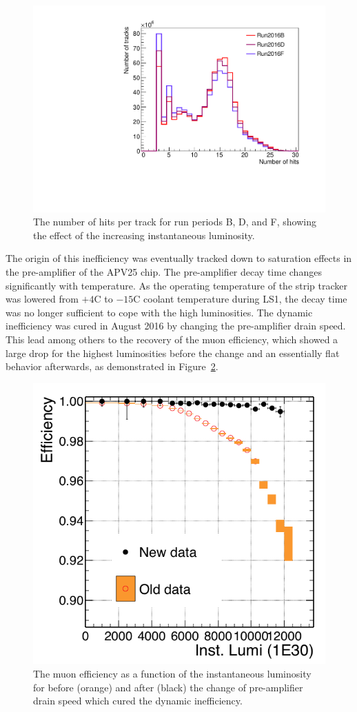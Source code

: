 \begin{figure}[ht]
  \centering
 \includegraphics[width=.6\textwidth]{nhits_perRunPeriod}
 \caption{The number of hits per track for run periods B, D, and F, showing the effect of the increasing instantaneous luminosity.}
 \label{fig:nhits}
\end{figure}

The origin of this inefficiency was eventually tracked down to saturation effects in the pre-amplifier of the APV25 chip. The pre-amplifier decay time changes significantly with temperature. As the operating temperature of the strip tracker was lowered from $+4$\degree C to $-15$\degree C coolant temperature during LS1, the decay time was no longer sufficient to cope with the high luminosities. The dynamic inefficiency was cured in August 2016 by changing the pre-amplifier drain speed. This lead among others to the recovery of the muon efficiency, which showed a large drop for the highest luminosities before the change and an essentially flat behavior afterwards, as demonstrated in Figure~\ref{fig:muoneff}.
  
\begin{figure}[ht]
  \centering
 \includegraphics[width=.6\textwidth]{APVsaturation_muoneff}
 \caption{The muon efficiency as a function of the instantaneous luminosity for before (orange) and after (black) the change of pre-amplifier drain speed which cured the dynamic inefficiency.}
 \label{fig:muoneff}
\end{figure}

\clearpage

\clearpage{\pagestyle{empty}\cleardoublepage}
